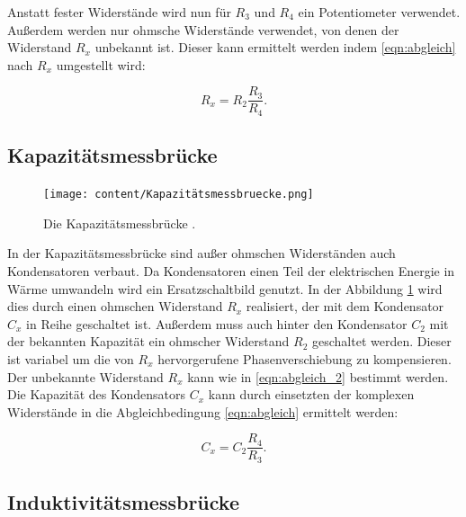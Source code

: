 Anstatt fester Widerstände wird nun für $R_3$ und $R_4$ ein Potentiometer verwendet.
Außerdem werden nur ohmsche Widerstände verwendet, von denen der Widerstand $R_x$ unbekannt ist.
Dieser kann ermittelt werden indem \eqref{eqn:abgleich} nach $R_x$ umgestellt wird:

\begin{equation}
    R_x = R_2 \frac{R_3}{R_4}.
    \label{eqn:abgleich_2}
\end{equation}

\subsection{Kapazitätsmessbrücke}

\begin{figure}
    \centering
    \texttt{[image: content/Kapazitätsmessbruecke.png]}
    \caption{Die Kapazitätsmessbrücke \cite[S. 220]{anleitung}.}
     \label{fig:kapaz}
\end{figure}

In der Kapazitätsmessbrücke sind außer ohmschen Widerständen auch Kondensatoren verbaut.
Da Kondensatoren einen Teil der elektrischen Energie in Wärme umwandeln wird ein Ersatzschaltbild genutzt.
In der Abbildung \ref{fig:kapaz} wird dies durch einen ohmschen Widerstand $R_x$ realisiert, der mit dem Kondensator $C_x$ in Reihe geschaltet ist.
Außerdem muss auch hinter den Kondensator $C_2$ mit der bekannten Kapazität ein ohmscher Widerstand $R_2$ geschaltet werden.
Dieser ist variabel um die von $R_x$ hervorgerufene Phasenverschiebung zu kompensieren.
Der unbekannte Widerstand $R_x$ kann wie in \eqref{eqn:abgleich_2} bestimmt werden.
Die Kapazität des Kondensators $C_x$ kann durch einsetzten der komplexen Widerstände in die
Abgleichbedingung \eqref{eqn:abgleich} ermittelt werden:

\begin{equation}
    C_x = C_2 \frac{R_4}{R_3}.
    \label{eqn:kapc}
\end{equation}

\subsection{Induktivitätsmessbrücke}

